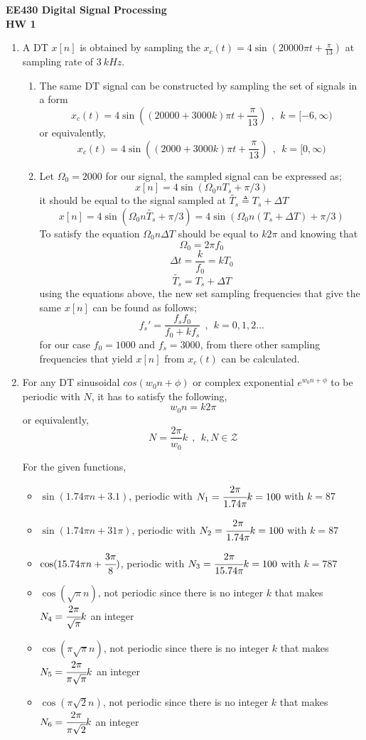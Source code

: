 \documentclass[a4paper,12pt]{article}
\begin{document}
\begin{center}
	\textbf{\large EE430 Digital Signal Processing \\[0.2cm] HW 1} \\
\end{center}

\begin{enumerate}
	\item A DT $x[n]$ is obtained by sampling the $ x_c(t) = 4\sin(20000\pi 𝑡 + \frac{\pi}{13})$ at sampling rate  of $3~kHz$.
		
		\begin{enumerate}
			\item The same DT signal can be constructed by sampling the set of signals in a form
				$$ x_c(t) = 4\sin((20000+ 3000k)\pi 𝑡 + \frac{\pi}{13})~~,~~k=[-6,\infty)$$ 
			 or equivalently,
				$$  x_c(t) = 4\sin((2000+3000k)\pi 𝑡 + \frac{\pi}{13})~~,~~k=[0,\infty)$$
			\item Let $\Omega_0=2000$ for our signal, the sampled signal can be expressed as;
				$$	x[n]=4\sin(\Omega_0nT_s+\pi/3)	$$
			it should be equal to the signal sampled at $\widetilde{T_s} \triangleq T_s+\Delta T$ 
				$$	x[n]=4\sin(\Omega_0n\widetilde{T_s}+\pi/3)=4\sin(\Omega_0n(T_s+\Delta T)+\pi/3)	$$
			To satisfy the equation $\Omega_0n\Delta T$ should be equal to $k2\pi$ and knowing that 
				$$	\Omega_0=2\pi f_0	$$
				$$	\Delta t=\frac{k}{f_0} = kT_0	$$
				$$ \widetilde{T_s}=T_s+\Delta T $$
			using the equations above, the new set sampling frequencies that give the same $x[n]$ can be found as follows;
				$$	\boxed{ f_s'=\frac{f_s f_0}{f_0+kf_s} }~~,~~k=0,1,2...	$$
			for our case $f_0=1000$ and $f_s=3000$, from there other sampling frequencies that yield $x[n]$ from $x_c(t)$ can be calculated.
			
			 
		\end{enumerate}

		
	
	\item For any DT sinusoidal $cos(w_0n+\phi)$ or complex exponential $e^{w_0n+\phi}$ to be periodic with $N$, it has to satisfy the following,
		$$	w_0n=k2\pi	$$
		or equivalently,
		$$\boxed{N=\frac{2\pi}{w_0}k} ~~,~~ k,N \in \mathcal{Z} 	$$
		
		For the given functions,
		\begin{itemize}
			\item $\sin(1.74\pi n+3.1)$, periodic with $N_1=\cfrac{2\pi}{1.74\pi}k=100$ with $k=87$
			\item $\sin(1.74\pi n+31\pi)$, periodic with $N_2=\cfrac{2\pi}{1.74\pi}k=100$ with $k=87$
			\item $\cos(15.74\pi n+\cfrac{3\pi}{8})$, periodic with $N_3=\cfrac{2\pi}{15.74\pi}k=100$ with $k=787$
			\item $\cos(\sqrt{\pi} n)$, not periodic since there is no integer $k$ that makes $N_4=\cfrac{2\pi}{\sqrt{\pi}} k$ an integer
			\item $\cos(\pi \sqrt{\pi} n)$, not periodic since there is no integer $k$ that makes $N_5=\cfrac{2\pi}{\pi \sqrt{\pi}}k$ an integer
			\item $\cos(\pi \sqrt{2} n)$, not periodic since there is no integer $k$ that makes $N_6=\cfrac{2\pi}{\pi \sqrt{2} }k$ an integer
			

\end{itemize}
\end{enumerate}
\end{document}
